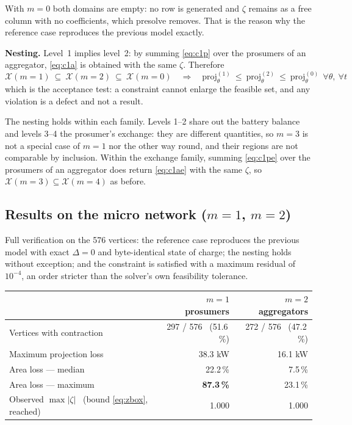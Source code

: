 \documentclass[11pt,a4paper]{article}
\newcommand{\nw}[1]{\textcolor{uaired}{#1}}
\begin{document}
With $m=0$ both domains are empty: no row is generated and $\zeta$ remains as a free column with no
coefficients, which presolve removes. That is the reason why the reference case reproduces the
previous model exactly.

\textbf{Nesting.} Level~1 implies level~2: by summing \eqref{eq:c1p} over the prosumers of
an aggregator, \eqref{eq:c1a} is obtained with the same $\zeta$. Therefore
\begin{equation}
\mathcal{X}(m{=}1)\ \subseteq\ \mathcal{X}(m{=}2)\ \subseteq\ \mathcal{X}(m{=}0)
\quad\Longrightarrow\quad
\mathrm{proj}_{\theta}^{(1)}\ \le\ \mathrm{proj}_{\theta}^{(2)}\ \le\ \mathrm{proj}_{\theta}^{(0)}
\ \ \forall\theta,\ \forall t
\end{equation}
which is the acceptance test: a constraint cannot enlarge the feasible set, and any
violation is a defect and not a result.

\nw{The nesting holds within each family.} Levels 1--2 share out the battery balance and levels 3--4
the prosumer's exchange: they are different quantities, so $m=3$ is not a special case of $m=1$ nor
the other way round, and their regions are not comparable by inclusion. Within the exchange family,
summing \eqref{eq:c1pe} over the prosumers of an aggregator does return \eqref{eq:c1ae} with the
same $\zeta$, so $\mathcal{X}(m{=}3)\subseteq\mathcal{X}(m{=}4)$ as before.

\subsection{Results on the micro network ($m=1$, $m=2$)}

Full verification on the 576 vertices: the reference case reproduces the previous model with
exact $\Delta=0$ and byte-identical state of charge; the nesting holds without exception; and the
constraint is satisfied with a maximum residual of $10^{-4}$, an order stricter than the solver's own
feasibility tolerance.

\begin{center}\small
\begin{tabular}{l r r}
\toprule
& \textbf{$m=1$ prosumers} & \textbf{$m=2$ aggregators}\\
\midrule
Vertices with contraction & 297 / 576 \ (51.6\,\%) & 272 / 576 \ (47.2\,\%)\\
Maximum projection loss & 38.3 kW & 16.1 kW\\
Area loss --- median & 22.2\,\% & 7.5\,\%\\
Area loss --- maximum & \textbf{87.3\,\%} & 23.1\,\%\\
Observed $\max|\zeta|$ \ \nw{(bound \eqref{eq:zbox}, reached)} & 1.000 & 1.000\\
\bottomrule
\end{tabular}
\end{center}
\end{document}
